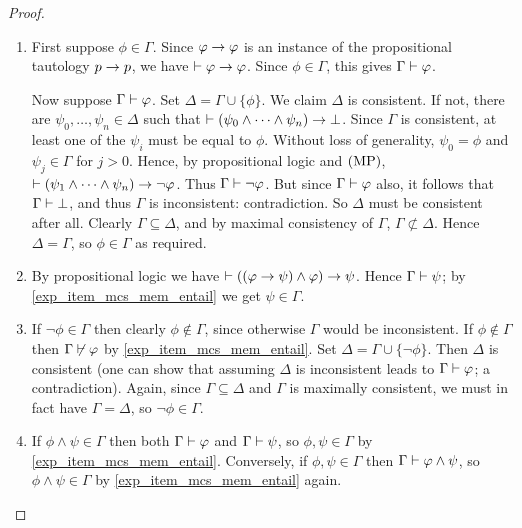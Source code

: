 \begin{proof}\leavevmode
    \begin{enumerate}

        \item First suppose $\phi \in \Gamma$. Since $\varphi \to \varphi$ is
              an instance of the propositional tautology $p \to p$, we
              have $\vdash \varphi \to \varphi$. Since $\phi \in \Gamma$, this
              gives $\Gamma \vdash \varphi$.

              Now suppose $\Gamma \vdash \varphi$. Set $\Delta = \Gamma \cup
              \{\phi\}$. We claim $\Delta$ is consistent. If not, there are
              $\psi_0,\ldots,\psi_n \in \Delta$ such that $\vdash (\psi_0 \land
              \cdots \land \psi_n) \to \bot$. Since $\Gamma$ is
              consistent, at least one of the $\psi_i$ must be equal to $\phi$.
              Without loss of generality, $\psi_0 = \phi$ and $\psi_j \in
              \Gamma$ for $j > 0$. Hence, by propositional logic and $(\text{MP})$,
              $\vdash (\psi_1 \land \cdots \land \psi_n) \to \neg \varphi$.
              Thus $\Gamma \vdash \neg\varphi$.  But since $\Gamma \vdash
              \varphi$ also, it follows that $\Gamma \vdash \bot$, and thus
              $\Gamma$ is inconsistent: contradiction. So $\Delta$ must be
              consistent after all. Clearly $\Gamma \subseteq \Delta$, and by
              maximal consistency of $\Gamma$, $\Gamma \not\subset \Delta$.
              Hence $\Delta = \Gamma$, so $\phi \in \Gamma$ as required.

        \item By propositional logic we have $\vdash ((\varphi \to \psi) \land
              \varphi) \to \psi$. Hence $\Gamma \vdash \psi$; by
              \cref{exp_item_mcs_mem_entail} we get $\psi \in \Gamma$.

        \item If $\neg\phi \in \Gamma$ then clearly $\phi \notin \Gamma$, since
              otherwise $\Gamma$ would be inconsistent. If $\phi \notin \Gamma$
              then $\Gamma \not\vdash \varphi$ by \cref{exp_item_mcs_mem_entail}.
              Set $\Delta = \Gamma \cup \{\neg\phi\}$. Then $\Delta$ is
              consistent (one can show that assuming $\Delta$ is inconsistent
              leads to $\Gamma \vdash \varphi$; a contradiction). Again, since
              $\Gamma \subseteq \Delta$ and $\Gamma$ is maximally consistent,
              we must in fact have $\Gamma = \Delta$, so $\neg\phi \in \Gamma$.

        \item If $\phi \land \psi \in \Gamma$ then both $\Gamma \vdash \varphi$
              and $\Gamma \vdash \psi$, so $\phi, \psi \in \Gamma$ by
              \cref{exp_item_mcs_mem_entail}.  Conversely, if $\phi, \psi \in
              \Gamma$ then $\Gamma \vdash \varphi \land \psi$, so $\phi \land
              \psi \in \Gamma$ by \cref{exp_item_mcs_mem_entail} again.

    \end{enumerate}
\end{proof}

